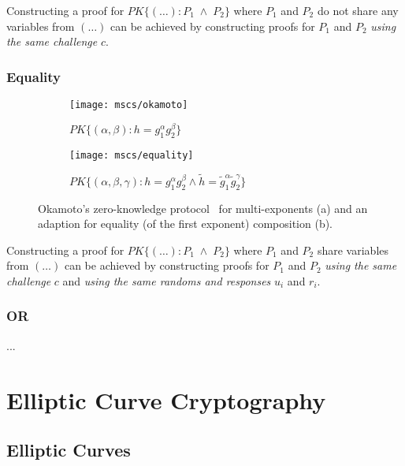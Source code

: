 Constructing a proof for $PK\{(\dots) : P_1 \;\land\; P_2 \}$ where $P_1$ and $P_2$ do not share any variables from $(\dots)$ can be achieved by constructing proofs for $P_1$ and $P_2$ \emph{using the same challenge} $c$.

\subsubsection{Equality}

\begin{figure}
  \centering
  \begin{subfigure}[b]{0.45\textwidth}
    \texttt{[image: mscs/okamoto]}
    \caption{$PK\{(\alpha, \beta) : h = g_1^\alpha g_2^\beta \}$}
    \label{msc:okamoto}
  \end{subfigure}
  \quad
  \begin{subfigure}[b]{0.45\textwidth}
    \texttt{[image: mscs/equality]}
    \caption{$PK\{(\alpha, \beta, \gamma) : h = g_1^\alpha g_2^\beta \land \tilde{h} = \tilde{g}_1^\alpha \tilde{g}_2^\gamma\}$}
    \label{msc:equality}
  \end{subfigure}
  \caption{Okamoto's zero-knowledge protocol~\cite{Okamoto1993} for multi-exponents (a) and an adaption for equality (of the first exponent) composition (b).}
  \label{fig:okamoto}
\end{figure}

Constructing a proof for $PK\{(\dots) : P_1 \;\land\; P_2 \}$ where $P_1$ and $P_2$ share variables from $(\dots)$ can be achieved by constructing proofs for $P_1$ and $P_2$ \emph{using the same challenge} $c$ and \emph{using the same randoms and responses} $u_i$ and $r_i$.


\subsubsection{OR} ...


\section{Elliptic Curve Cryptography}

\subsection{Elliptic Curves}

